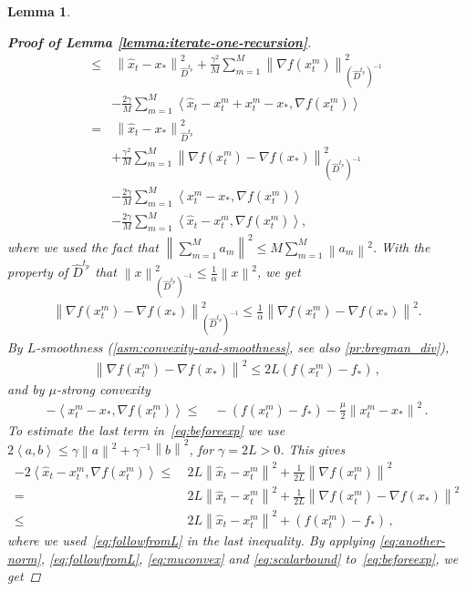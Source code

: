 \documentclass[sn-mathphys,Numbered]{sn-jnl}%
\newtheorem{lemma}{Lemma}%
\renewcommand{\|}{\parallel}
\newcommand\ev[1]{\left \langle #1 \right \rangle}
\newcommand{\sqn}[1]{{\left\lVert#1\right\rVert}^2}
\renewcommand {\*} {\ast}
\begin{document}
\begin{lemma}
\begin{proof}[\bf Proof of Lemma \ref{lemma:iterate-one-recursion}]
\begin{align}
    \leq&\ \sqn{\hat{x}_t-x_\ast}_{\hat{D}^{t_p}} + \frac{\gamma^2}{M} \sum_{m=1}^M \sqn{\nabla f(x_t^m)}_{(\hat{D}^{t_p})^{-1}}  \nonumber \\
    & - \frac{2\gamma}{M} \sum_{m=1}^M \ev{\hat{x}_t - x_t^m + x_t^m -x_\ast, \nabla f(x_t^m)} \nonumber \\
    =&\ \sqn{\hat{x}_t-x_\ast}_{\hat{D}^{t_p}} \nonumber \\ &+  \frac{\gamma^2}{M} \sum_{m=1}^M \sqn{\nabla f(x_t^m) - \nabla f(x_\ast)}_{(\hat{D}^{t_p})^{-1}} \nonumber \\
    &-  \frac{2\gamma}{M} \sum_{m=1}^M \ev{ x_t^m -x_\ast, \nabla f(x_t^m)} \nonumber \\ \label{eq:beforeexp} &-  \frac{2\gamma}{M} \sum_{m=1}^M \ev{\hat{x}_t - x_t^m, \nabla f(x_t^m)},
\end{align}
where we used the fact that $\sqn {\sum_{m=1}^M a_m} \leq M \sum_{m=1}^M \sqn{a_m}$. With the property of $\hat{D}^{t_p}$ that $\sqn{x}_{(\hat{D}^{t_p})^{-1}} \leq \frac{1}{\alpha}\sqn{x} $, we get
\begin{align}
    \label{eq:another-norm}
    \sqn{\nabla f(x_t^m) - \nabla f(x_\ast)}_{(\hat{D}^{t_p})^{-1}} \leq \frac{1}{\alpha}\sqn{\nabla f(x_t^m) - \nabla f(x_\ast)}.
\end{align}
By $L$-smoothness (\cref{asm:convexity-and-smoothness}, see also \eqref{pr:bregman_div}), 
\begin{align}
\sqn{\nabla f(x_t^m)- \nabla f(x_\ast)} \leq 2L(f(x_t^m) - f_\ast)\,, \label{eq:followfromL}
\end{align}
and by $\mu$-strong convexity
\begin{align}
    \label{eq:muconvex}
  -  \ev{x_t^m-x_\ast, \nabla f(x_t^m)} \leq&\ - (f(x_t^m)- f_\ast) - \frac{\mu}{2}\sqn{x_t^m-x_\ast}\,.
\end{align}
To estimate the last term in~\eqref{eq:beforeexp} we use $ 2 \ev{a,b} \leq \gamma \sqn{a} + \gamma^{-1} \sqn{b}$, for $\gamma = 2L > 0$. This gives
\begin{align}
\label{eq:scalarbound}
-2 \ev{\hat{x}_t - x_t^m, \nabla f(x_t^m)} \leq&\ 2L \sqn{\hat{x}_t - x_t^m} + \frac{1}{2L} \sqn{\nabla f(x_t^m) } \nonumber \\
=&\ 2L \sqn{\hat{x}_t - x_t^m} + \frac{1}{2L} \sqn{\nabla f(x_t^m) - \nabla f(x_\ast) } \nonumber \\
\leq&\ 2L \sqn{\hat{x}_t - x_t^m} + (f(x_t^m) - f_\ast)\,,
\end{align} 
where we used~\eqref{eq:followfromL} in the last inequality.
By applying \eqref{eq:another-norm}, \eqref{eq:followfromL}, \eqref{eq:muconvex} and \eqref{eq:scalarbound} to~\eqref{eq:beforeexp}, we get

\end{proof}
\end{lemma}
\end{document}
